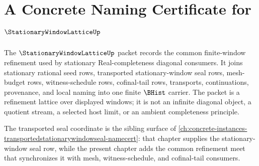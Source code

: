 \chapter{A Concrete Naming Certificate for $\StationaryWindowLatticeUp$}
\label{ch:concrete-instances-stationarywindowlattice-namecert}

The $\StationaryWindowLatticeUp$ packet records the common finite-window refinement used by stationary Real-completeness diagonal consumers. It joins stationary rational seed rows, transported stationary-window seal rows, mesh-budget rows, witness-schedule rows, cofinal-tail rows, transports, continuations, provenance, and local naming into one finite $\BHist$ carrier. The packet is a refinement lattice over displayed windows; it is not an infinite diagonal object, a quotient stream, a selected host limit, or an ambient completeness principle.

The transported seal coordinate is the sibling surface of \autoref{ch:concrete-instances-transportedstationarywindowseal-namecert}: that chapter supplies the stationary-window seal row, while the present chapter adds the common refinement meet that synchronizes it with mesh, witness-schedule, and cofinal-tail consumers.


